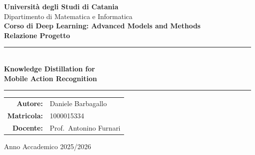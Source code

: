 \begin{titlepage}
\centering

\vspace*{1.5cm}

{\Huge \textbf{Università degli Studi di Catania}}\\[0.5cm]
{\large Dipartimento di Matematica e Informatica}\\[2cm]

{\Large \textbf{Corso di Deep Learning: Advanced Models and Methods}}\\[0.4cm]
{\large \textbf{Relazione Progetto}}\\[2.5cm]

\rule{\textwidth}{1.2pt}\\[0.6cm]
{\Huge\bfseries Knowledge Distillation for\\[0.2cm] Mobile Action Recognition}\\[0.6cm]
\rule{\textwidth}{1.2pt}

\vspace{5.5cm}
\begin{flushright}
\begin{tabular}{@{}rl@{}}
\textbf{Autore:}          & Daniele Barbagallo\\[0.2cm]
\textbf{Matricola:}       & 1000015334\\[0.5cm]
\textbf{Docente:}         & Prof.\ Antonino Furnari\\[0.15cm]
\end{tabular}
\end{flushright}

\vspace{0.5cm}

\begin{center}
{Anno Accademico 2025/2026}
\end{center}

\end{titlepage}

\clearpage
